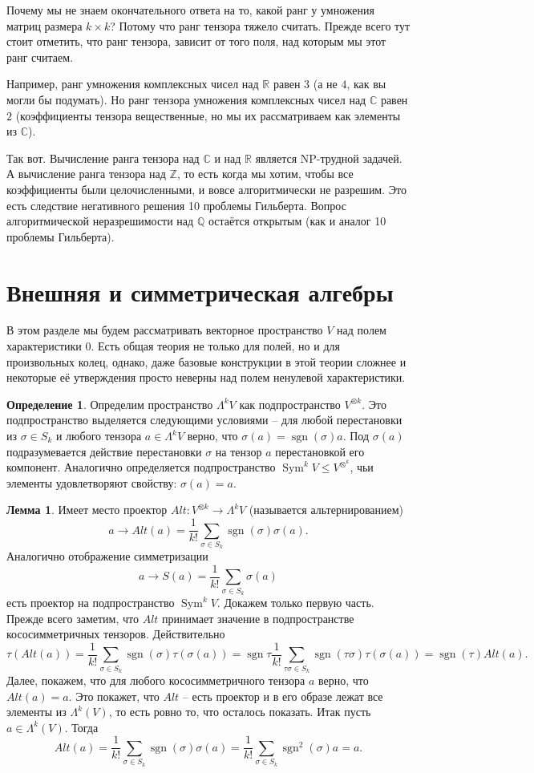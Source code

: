 \documentclass[12pt,a4paper,oneside]{book}
\theoremstyle{definition}
\newtheorem*{defn}{\color{yellow!30!red} Определение}
\newtheorem{lem}{\color{green!50!black}Лемма}
\renewcommand{\leq}{\leqslant}
\newcommand{\Sym}{\operatorname{Sym}}
\newcommand{\sgn}{\operatorname{sgn}}
\newcommand{\Z}{\mathbb Z}
\newcommand{\R}{\mathbb R}
\renewcommand{\C}{\mathbb C}
\newcommand{\Q}{\mathbb Q}
\def\dfn{\begin{defn}}
\def\edfn{\end{defn}}
\def\lm{\begin{lem}}
\def\elm{\end{lem}}
\begin{document}
Почему мы не знаем окончательного ответа на то, какой ранг у умножения матриц размера $k\times k$? Потому что ранг тензора тяжело считать. Прежде всего тут стоит отметить, что ранг тензора, зависит от того поля, над которым мы этот ранг считаем. 

Например, ранг умножения комплексных чисел над $\R$ равен $3$ (а не $4$, как вы могли бы подумать). Но ранг тензора умножения комплексных чисел над $\C$ равен $2$ (коэффициенты тензора вещественные, но мы их  рассматриваем как элементы из $\C$).  

Так вот. Вычисление ранга тензора над $\C$ и над $\R$ является NP-трудной задачей. А вычисление ранга тензора над $\Z$, то есть когда мы хотим, чтобы все коэффициенты были целочисленными, и вовсе алгоритмически не разрешим. Это есть следствие негативного решения 10 проблемы Гильберта. Вопрос алгоритмической неразрешимости над $\Q$ остаётся открытым (как и аналог 10 проблемы Гильберта).




\section{Внешняя и симметрическая алгебры}

В этом разделе мы будем рассматривать векторное пространство $V$ над полем характеристики $0$. Есть общая теория не только для полей, но и для произвольных колец, однако, даже базовые конструкции в этой теории сложнее и некоторые её утверждения просто неверны над полем ненулевой характеристики.

\dfn Определим пространство $\Lambda^k V$ как подпространство $V^{\otimes k}$. Это подпространство выделяется следующими условиями -- для любой перестановки из $\sigma \in S_k$ и любого тензора $a\in \Lambda^k V$ верно, что $\sigma(a)=\sgn(\sigma)a$. Под $\sigma(a)$ подразумевается действие перестановки $\sigma$ на тензор $a$ перестановкой его компонент. Аналогично определяется подпространство $\Sym^k V \leq V^{\otimes^k}$, чьи элементы удовлетворяют свойству: $\sigma(a)=a$.
\edfn

\lm Имеет место проектор $Alt \colon V^{\otimes k} \to \Lambda^k V$ (называется альтернированием) 
$$a \to Alt(a)=\frac{1}{k!} \sum_{\sigma \in S_k} \sgn (\sigma) \sigma(a).$$
Аналогично отображение  симметризации
$$ a \to S(a)= \frac{1}{k!} \sum_{\sigma \in S_k} \sigma(a)$$
есть проектор на подпространство $\Sym^k V$.
\proof Докажем только первую часть. Прежде всего заметим, что $Alt$ принимает значение в подпространстве кососимметричных тензоров. Действительно 
$$\tau(Alt(a))=\frac{1}{k!}\sum_{\sigma \in S_k}\sgn(\sigma) \tau(\sigma(a))= \sgn{\tau} \frac{1}{k!}\sum_{\tau\sigma \in S_k} \sgn(\tau\sigma) \tau(\sigma(a))=\sgn(\tau) Alt(a).$$
Далее, покажем, что для любого кососимметричного тензора $a$ верно, что $Alt(a)=a$. Это покажет, что $Alt$ -- есть проектор и в его образе лежат все элементы из $\Lambda^k(V)$, то есть ровно то, что осталось показать. Итак пусть $a\in \Lambda^k(V)$. Тогда 
$$Alt(a)=\frac{1}{k!} \sum_{\sigma \in S_k} \sgn (\sigma) \sigma(a)=\frac{1}{k!} \sum_{\sigma \in S_k} \sgn^2(\sigma) a=a.$$
\endproof
\elm
\end{document}
